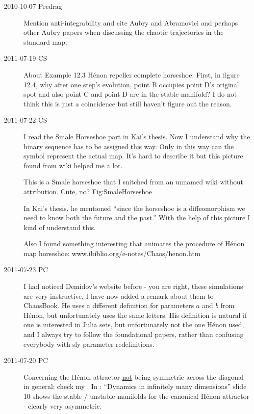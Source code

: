 \begin{description}

\item[2010-10-07 Predrag]
                                                            \toCB
Mention anti-integrability and cite Aubry and Abramovici
and perhaps other Aubry papers when
discussing the chaotic trajectories in the standard map.

\item[2011-07-19 CS]
About Example 12.3 H\'enon repeller complete horseshoe:
First, in figure 12.4, why after one step's evolution, point B occupies
point D's original spot and also point C and point D are in the stable
manifold? I do not think this is just a coincidence but still haven't
figure out the reason.

\item[2011-07-22 CS] I read the Smale Horseshoe part in Kai's thesis. Now
I understand why the binary sequence has to be assigned this way. Only in
this way can the symbol represent the actual map. It's hard to describe
it but this picture found from wiki helped me a lot.

{}{
This is a Smale horseshoe that I snitched from an unnamed wiki
without attribution. Cute, no?
    }{Fig:SmaleHorseshoe}

In Kai's thesis, he mentioned ``since the horseshoe is a diffeomorphism
we need to know both the future and the past.'' With the help of this
picture I kind of understand this.

Also I found something interesting that animates the procedure of H\'enon
map horseshoe:
{www.ibiblio.org/e-notes/Chaos/henon.htm}

\item[2011-07-23 PC]                                        \inCB
I had noticed Demidov's website before - you are right, these simulations
are very instructive, I have now added a remark about them to ChaosBook.
He uses a different definition for parameters $a$ and $b$ from H\'enon,
but unfortunately uses the same letters. His definition is natural if one
is interested in Julia sets, but unfortunately not the one H\'enon used,
and I always try to follow the foundational papers, rather than confusing
everybody with sly parameter redefinitions.


\item[2011-07-20 PC]                                        \toCB
Concerning the H\'enon attractor \underline{not} being symmetric across
the diagonal in general: check my
.
In : ``Dynamics in infinitely many dimensions'' slide 10 shows the
stable / unstable manifolds for the canonical H\'enon attractor - clearly
very asymmetric.


\end{description}
